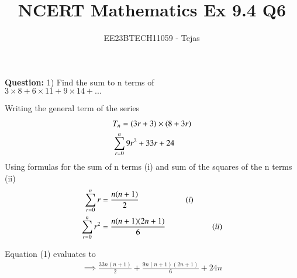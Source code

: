 \documentclass[journal,12pt,twocolumn]{IEEEtran}
\theoremstyle{remark}
\begin{document}

\vspace{3cm}

\title{NCERT Mathematics Ex 9.4 Q6}
\author{EE23BTECH11059 - Tejas$^{}$%
}
\maketitle
\newpage
\textbf{Question:}
1) Find the sum to n terms of\\$3 \times 8 + 6 \times 11 + 9 \times 14 + ...$
        

    
    \solution
        
        Writing the general term of the series
        \begin{align}
            &T_n=(3r+3)\times(8+3r) \notag \\
            &\sum_{r=0}^{n}9r^2+33r+24 
        \end{align}
        Using formulas for the sum of n terms (i) and sum of the squares of the n terms (ii) \\
          \begin{align}
            \sum_{r=0}^{n}r&=\frac{n(n+1)}{2} \hspace{2cm}(i)\notag \\
            \sum_{r=0}^{n}r^2&=\frac{n(n+1)(2n+1)}{6} \hspace{2cm}(ii)\notag 
        \end{align}
        
        
        Equation (1) evaluates to
        \\
             \begin{align*}
                \implies \frac{33n(n+1)}{2} + \frac{9n(n+1)(2n+1)}{6} + 24n
            \end{align*}
            
           
             
             
             
        

        













\renewcommand{\thefigure}{\theenumi}
\renewcommand{\thetable}{\theenumi}
\end{document}
